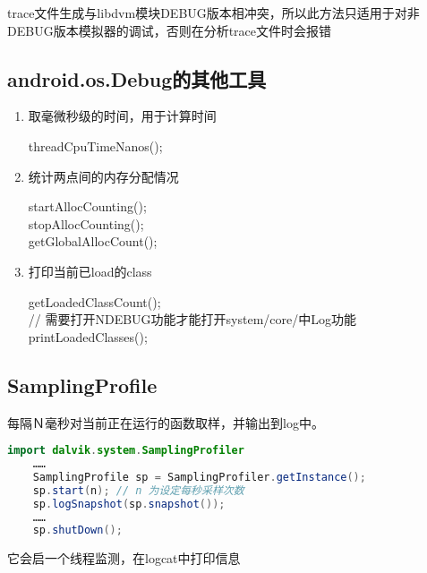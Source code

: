 \documentclass[a4paper,titlepage]{article}
\begin{document}
trace文件生成与libdvm模块DEBUG版本相冲突，所以此方法只适用于对非DEBUG版本模拟器的调试，否则在分析trace文件时会报错

\subsection{android.os.Debug的其他工具}
\begin{enumerate}
    \item 取毫微秒级的时间，用于计算时间

        threadCpuTimeNanos();

    \item 统计两点间的内存分配情况

        startAllocCounting();\\
        stopAllocCounting();\\
        getGlobalAllocCount();

    \item 打印当前已load的class

        getLoadedClassCount();\\
         //  需要打开NDEBUG功能才能打开system/core/中Log功能\\
        printLoadedClasses(); 
\end{enumerate}

\subsection{SamplingProfile}
每隔Ｎ毫秒对当前正在运行的函数取样，并输出到log中。

\begin{lstlisting}[language=java]
    import dalvik.system.SamplingProfiler
    ……
    SamplingProfile sp = SamplingProfiler.getInstance();
    sp.start(n); // n 为设定每秒采样次数
    sp.logSnapshot(sp.snapshot());
    ……
    sp.shutDown();
\end{lstlisting}
    它会启一个线程监测，在logcat中打印信息
\end{document}
